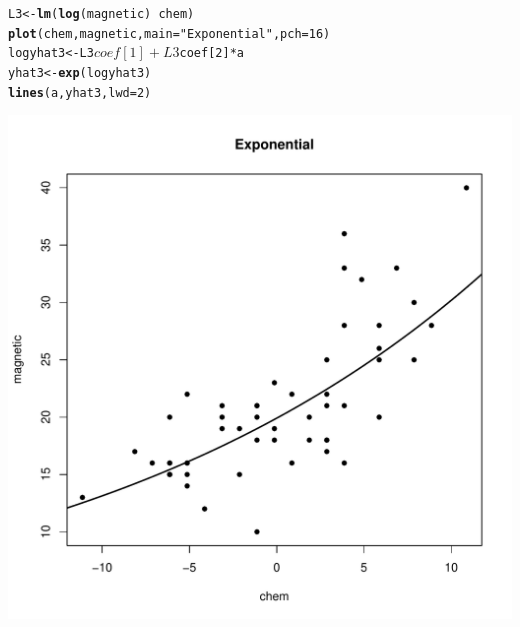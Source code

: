 \documentclass{article}\usepackage[]{graphicx}\usepackage[]{color}
\makeatletter
\def\maxwidth{ %
  \ifdim\Gin@nat@width>\linewidth
    \linewidth
  \else
    \Gin@nat@width
  \fi
}
\newcommand{\hlstr}[1]{\textcolor[rgb]{0.192,0.494,0.8}{#1}}%
\newcommand{\hlkwd}[1]{\textcolor[rgb]{0.737,0.353,0.396}{\textbf{#1}}}%
\newenvironment{kframe}{%
 \def\at@end@of@kframe{}%
 \ifinner\ifhmode%
  \def\at@end@of@kframe{\end{minipage}}%
  \begin{minipage}{\columnwidth}%
 \fi\fi%
 \def\FrameCommand##1{\hskip\@totalleftmargin \hskip-\fboxsep
 \colorbox{shadecolor}{##1}\hskip-\fboxsep
     \hskip-\linewidth \hskip-\@totalleftmargin \hskip\columnwidth}%
 \MakeFramed {\advance\hsize-\width
   \@totalleftmargin\z@ \linewidth\hsize
   \@setminipage}}%
 {\par\unskip\endMakeFramed%
 \at@end@of@kframe}
\newenvironment{knitrout}{}{} %
\makeatother
\begin{document}
\begin{itemize}
\begin{knitrout}
\begin{kframe}
\begin{alltt}
L3 <- \hlkwd{lm}(\hlkwd{log}(magnetic) ~ chem)
\hlkwd{plot}(chem, magnetic, main = \hlstr{"Exponential"}, pch = 16)
logyhat3 <- L3$coef[1] + L3$coef[2] * a
yhat3 <- \hlkwd{exp}(logyhat3)
\hlkwd{lines}(a, yhat3, lwd = 2)
\end{alltt}
\end{kframe}
\includegraphics[width=\maxwidth]{figure/seven103} 
\begin{kframe}\begin{alltt}


\end{alltt}
\end{kframe}
\end{knitrout}
\end{itemize}
\end{document}
